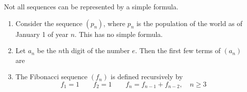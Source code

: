 \begin{frame}
Not all sequences can be represented by a simple formula.
\begin{example}
\begin{enumerate}
\item  Consider the sequence $( p_n)$, where $p_n$ is the population of the world as of January 1 of year $n$.  This has no simple formula.
\item<2->  Let $a_n$ be the $n$th digit of the number $e$.  Then the first few terms of $( a_n)$ are
%
\item<3->  The Fibonacci sequence $( f_n)$ is defined recursively by
\[
f_1 = 1 \qquad f_2 = 1 \qquad f_n = f_{n-1} + f_{n-2}, \quad n\geq 3
\]
%
%
\end{enumerate}
\end{example}
\end{frame}
